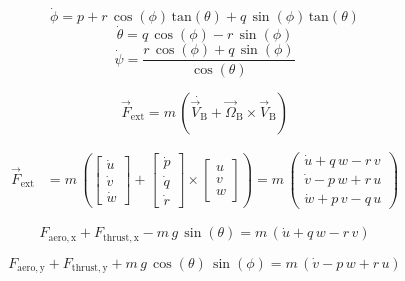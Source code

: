 \documentclass[lettersize,journal]{IEEEtran}
\begin{document}
{\begin{equation}
\dot{\phi }=p+r\,\cos\left(\phi \right)\,\mathrm{tan}\left(\theta \right)+q\,\sin\left(\phi \right)\,\mathrm{tan}\left(\theta \right)
\end{equation}
\begin{equation}
\dot{\theta }=q\,\cos\left(\phi \right)-r\,\sin\left(\phi \right)
\end{equation}
\begin{equation}
\dot{\psi }=\frac{r\,\cos\left(\phi \right)+q\,\sin\left(\phi \right)}{\cos\left(\theta \right)}
\end{equation}

\newpage

\begin{equation}
\overrightarrow{F}_{\mathrm{ext}}=m\,\left(\dot{\overrightarrow{V}_{\mathrm{B}}} + \overrightarrow{\Omega}_{\mathrm{B}} \times \overrightarrow{V}_{\mathrm{B}} \right)
\end{equation}

\begin{equation}
\begin{aligned}
\overrightarrow{F}_{\mathrm{ext}}&=m\,\left( \left[\begin{array}{c} \dot{u}\\ \dot{v}\\ \dot{w} \end{array}\right] + \left[\begin{array}{c} \dot{p}\\ \dot{q}\\ \dot{r} \end{array}\right] \times \left[\begin{array}{c} u\\ v\\ w \end{array}\right] \right) = m\,\left(\begin{array}{c} \dot{u}+q\,w-r\,v\\ \dot{v}-p\,w+r\,u\\ \dot{w}+p\,v-q\,u \end{array}\right)
\end{aligned}
\end{equation}

\begin{equation}
F_{\mathrm{aero,x}}+F_{\mathrm{thrust,x}}-m\,g\,\sin\left(\theta \right)=m\,\left(\dot{u}+q\,w-r\,v\right)
\end{equation}

\begin{equation}
F_{\mathrm{aero,y}}+F_{\mathrm{thrust,y}}+m\,g\,\cos\left(\theta \right)\,\sin\left(\phi \right)=m\,\left(\dot{v}-p\,w+r\,u\right)
\end{equation}

}
\end{document}
